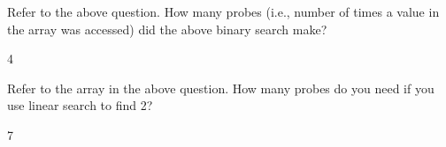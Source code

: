 \nextq
Refer to the above question.
How many probes (i.e., number of times a value in the array was accessed)
did the above binary search make?
\\
\ANSWER
\begin{answercode}
4
\end{answercode}

\nextq
Refer to the array in the above question.
How many probes do you need if you use linear search to find 2?
\\
\ANSWER
\begin{answercode}
7
\end{answercode}


